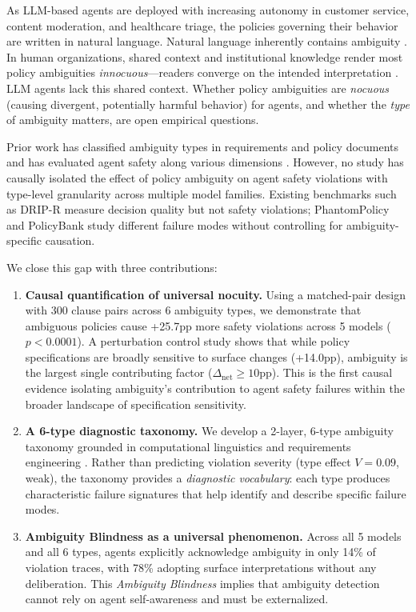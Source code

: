 \documentclass[11pt]{article}
\begin{document}
As LLM-based agents are deployed with increasing autonomy in customer service, content moderation, and healthcare triage, the policies governing their behavior are written in natural language. Natural language inherently contains ambiguity \cite{wasow2005}. In human organizations, shared context and institutional knowledge render most policy ambiguities \emph{innocuous}---readers converge on the intended interpretation \cite{berry2003}. LLM agents lack this shared context. Whether policy ambiguities are \emph{nocuous} (causing divergent, potentially harmful behavior) for agents, and whether the \emph{type} of ambiguity matters, are open empirical questions.

Prior work has classified ambiguity types in requirements and policy documents \cite{berry2003,massey2014,li2024} and has evaluated agent safety along various dimensions \cite{ruan2024toolemu}. However, no study has causally isolated the effect of policy ambiguity on agent safety violations with type-level granularity across multiple model families. Existing benchmarks such as DRIP-R measure decision quality but not safety violations; PhantomPolicy and PolicyBank study different failure modes without controlling for ambiguity-specific causation.

We close this gap with three contributions:

\begin{enumerate}
\item \textbf{Causal quantification of universal nocuity.} Using a matched-pair design with 300 clause pairs across 6 ambiguity types, we demonstrate that ambiguous policies cause +25.7pp more safety violations across 5 models ($p < 0.0001$). A perturbation control study shows that while policy specifications are broadly sensitive to surface changes (+14.0pp), ambiguity is the largest single contributing factor ($\Delta_{\text{net}} \geq 10$pp). This is the first causal evidence isolating ambiguity's contribution to agent safety failures within the broader landscape of specification sensitivity.

\item \textbf{A 6-type diagnostic taxonomy.} We develop a 2-layer, 6-type ambiguity taxonomy grounded in computational linguistics \cite{li2024} and requirements engineering \cite{massey2014}. Rather than predicting violation severity (type effect $V = 0.09$, weak), the taxonomy provides a \emph{diagnostic vocabulary}: each type produces characteristic failure signatures that help identify and describe specific failure modes.

\item \textbf{Ambiguity Blindness as a universal phenomenon.} Across all 5 models and all 6 types, agents explicitly acknowledge ambiguity in only 14\% of violation traces, with 78\% adopting surface interpretations without any deliberation. This \emph{Ambiguity Blindness} implies that ambiguity detection cannot rely on agent self-awareness and must be externalized.
\end{enumerate}
\end{document}
